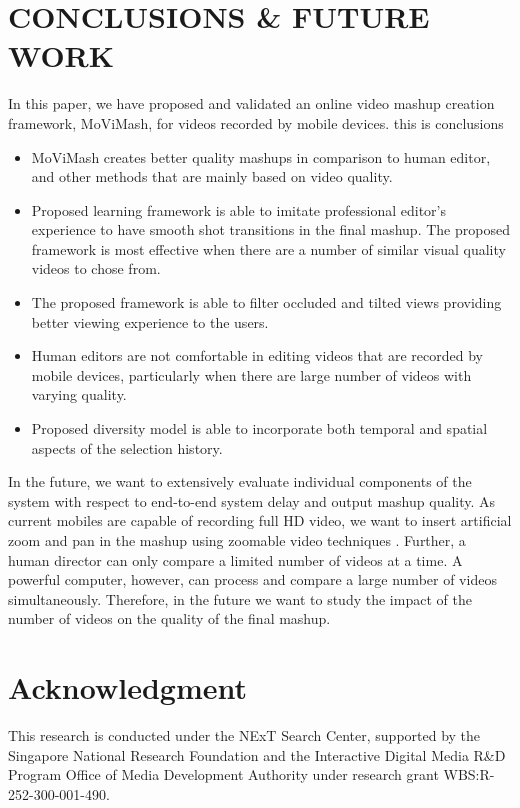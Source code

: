 \documentclass{sig-alternate}
\begin{document}
\section{CONCLUSIONS & FUTURE WORK}
In this paper, we have proposed and validated an online video
mashup creation framework, MoViMash, for videos recorded by
mobile devices. this is conclusions

\begin{itemize}
    \item  MoViMash creates better quality mashups in comparison to human editor, and other methods that are mainly based on video quality.
    \item Proposed learning framework is able to imitate professional editor’s experience to have smooth shot transitions in the final mashup. The proposed framework is most effective when there are a number of similar visual quality videos to chose from.
    \item The proposed framework is able to filter occluded and tilted views providing better viewing experience to the users.
    \item Human editors are not comfortable in editing videos that are recorded by mobile devices, particularly when there are large number of videos with varying quality.
    \item Proposed diversity model is able to incorporate both temporal and spatial aspects of the selection history.
    
\end{itemize}
In the future, we want to extensively evaluate individual components of the system with respect to end-to-end system delay and
output mashup quality. As current mobiles are capable of recording full HD video, we want to insert artificial zoom and pan in the
mashup using zoomable video techniques \cite{11}. Further, a human
director can only compare a limited number of videos at a time.
A powerful computer, however, can process and compare a large
number of videos simultaneously. Therefore, in the future we want
to study the impact of the number of videos on the quality of the
final mashup.

\section*{Acknowledgment}
This research is conducted under the NExT Search Center, supported by the Singapore National Research Foundation and the Interactive Digital Media R&D Program Office of Media Development Authority under research grant WBS:R-252-300-001-490.





















  
\end{document}
